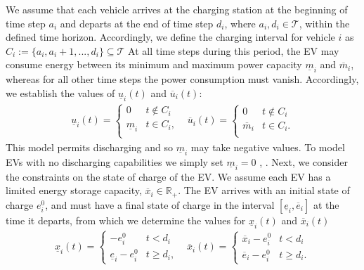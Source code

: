 We assume that each vehicle arrives at the charging station at the beginning of time step $a_i$ and departs at the end of time step $d_i$, where $a_i, d_i \in \mathcal{T}$,  within the defined time horizon. Accordingly, we define the charging interval for vehicle $i$ as $C_i := \{a_i, a_i +1,...,d_i\} \subseteq \mathcal{T}$
At all time steps during this period, the EV may consume energy between its minimum and maximum power capacity $\underline{m}_i$ and $\overline{m}_i$, whereas for all other time steps the power consumption must vanish. Accordingly, we establish the values of $\underline{u}_i(t)$ and $\overline{u}_i(t)$:
\begin{equation*}
    \begin{array}{cc}
        \underline{u}_i(t) = 
        \begin{cases}
            0                   & t \notin C_i  \\
            \underline{m}_i     & t \in C_i,\\
        \end{cases}
        & 
        \overline{u}_i(t) = 
        \begin{cases}
            0                   & t \notin C_i \\
            \overline{m}_i     &  t \in C_i.\\
        \end{cases}
    \end{array}
\end{equation*}
This model permits discharging and so $\underline{m}_i$ may take negative values. To model EVs with no discharging capabilities we simply set $\underline{m}_i = 0$ \cite{Panda2024EfficientVehicles}, \cite{Mukhi2023AnVehicles}.
Next, we consider the constraints on the state of charge of the EV. We assume each EV has a limited energy storage capacity, $\overline{x}_i \in \mathbb{R}_+$. The EV arrives with an initial state of charge $e^0_{i}$, and must have a final state of charge in the interval $[\underline{e}_i, \overline{e}_i]$ at the time it departs, from which we determine the values for $\underline{x}_i(t)$ and $\overline{x}_i(t)$ \cite{Taha2024AnPopulations} \cite{Hao2014CharacterizingLoads} 
\begin{equation*}
    \begin{array}{cc}
        \underline{x}_i(t) = 
        \begin{cases}
            -e^0_{i}                  & t < d_i\\
            \underline{e}_i -e^0_{i}  & t \geq d_i,
        \end{cases} 
        & 
        \overline{x}_i(t) = 
        \begin{cases}
            \overline{x}_i -e^0_{i}   & t < d_i\\
            \overline{e}_i -e^0_{i}   & t \geq d_i.
        \end{cases} 
    \end{array}
\end{equation*}

